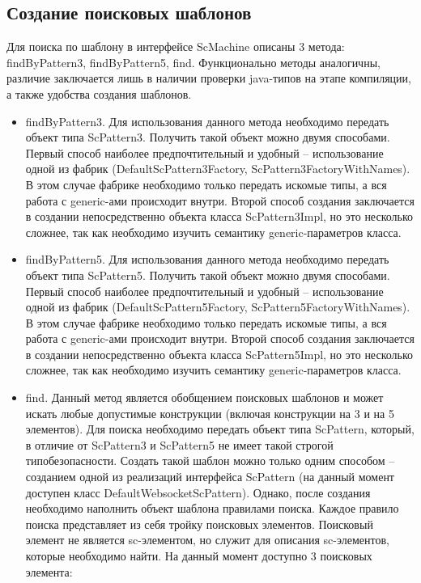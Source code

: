 \subsection{Создание поисковых шаблонов}

Для поиска по шаблону в интерфейсе ScMachine описаны 3 метода: findByPattern3, findByPattern5, find.
Функционально методы аналогичны, различие заключается лишь в наличии проверки java-типов на этапе компиляции, а также удобства создания шаблонов. 
\begin{itemize}
\item findByPattern3. Для использования данного метода необходимо передать объект типа ScPattern3. Получить такой объект можно двумя способами. Первый способ наиболее предпочтительный и удобный -- использование одной из фабрик (DefaultScPattern3Factory, ScPattern3FactoryWithNames). В этом случае фабрике необходимо только передать искомые типы, а вся работа с generic-ами происходит внутри. Второй способ создания заключается в создании непосредственно объекта класса ScPattern3Impl, но это несколько сложнее, так как необходимо изучить семантику generic-параметров класса. 
\item findByPattern5. Для использования данного метода необходимо передать объект типа ScPattern5. Получить такой объект можно двумя способами. Первый способ наиболее предпочтительный и удобный -- использование одной из фабрик (DefaultScPattern5Factory, ScPattern5FactoryWithNames). В этом случае фабрике необходимо только передать искомые типы, а вся работа с generic-ами происходит внутри. Второй способ создания заключается в создании непосредственно объекта класса ScPattern5Impl, но это несколько сложнее, так как необходимо изучить семантику generic-параметров класса. 
\item find. Данный метод является обобщением поисковых шаблонов и может искать любые допустимые конструкции (включая конструкции на 3 и на 5 элементов). Для поиска необходимо передать объект типа ScPattern, который, в отличие от ScPattern3 и ScPattern5 не имеет такой строгой типобезопасности. Создать такой шаблон можно только одним способом -- созданием одной из реализаций интерфейса ScPattern (на данный момент доступен класс DefaultWebsocketScPattern). Однако, после создания необходимо наполнить объект шаблона правилами поиска. Каждое правило поиска представляет из себя тройку поисковых элементов. Поисковый элемент не является sc-элементом, но служит для описания sc-элементов, которые необходимо найти. На данный момент доступно 3 поисковых элемента:
\begin{enumerate}

\end{enumerate}
\end{itemize}
